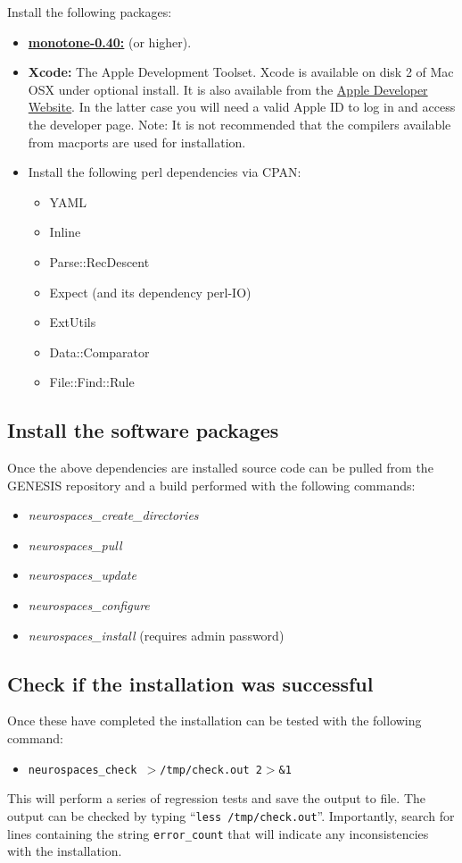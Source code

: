 \documentclass[12pt]{article}
\begin{document}
Install the following packages:
\begin{itemize}
   \item[]\href{http://monotone.ca/}{\bf monotone-0.40:} (or higher).
   \item[]{\bf Xcode:} The Apple Development Toolset. Xcode is available on disk 2 of Mac OSX under optional install. It is also available from the \href{http://developer.apple.com/technology/xcode.html}{Apple Developer Website}. In the latter case  you will need a valid Apple ID to log in and access the developer page. Note: It is not recommended that the compilers available from macports are used for installation.
   \item[]Install the following perl dependencies via CPAN:
      \begin{itemize}
         \item YAML
         \item Inline
         \item Parse::RecDescent
         \item Expect (and its dependency perl-IO)
         \item ExtUtils
         \item Data::Comparator
         \item File::Find::Rule
      \end{itemize}
   \end{itemize}
   
\subsection*{Install the software packages}

Once the above dependencies are installed source code can be pulled from the GENESIS repository and a build performed with the following commands:
\begin{itemize}
   \item[]{\it neurospaces\_create\_directories}
   \item[]{\it neurospaces\_pull}
   \item[]{\it neurospaces\_update}
   \item[]{\it neurospaces\_configure}
   \item[]{\it neurospaces\_install} (requires admin password) 
\end{itemize}

\subsection*{Check if the installation was successful}

Once these have completed the installation can be tested with the following command:
\begin{itemize}
   \item[]{\tt neurospaces\_check $>$/tmp/check.out 2$>$\&1}
\end{itemize}
This will perform a series of regression tests and save the output to file. The output can be checked by typing ``{\tt less /tmp/check.out}''. Importantly, search for lines containing the string {\tt error\_count} that will indicate any inconsistencies with the installation.
\end{document}
